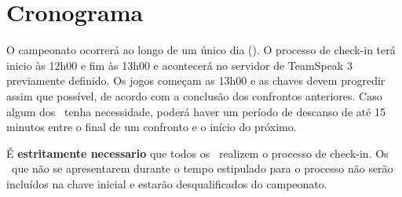 \section{Cronograma}

O campeonato ocorrerá ao longo de um único dia (\FullDate). O processo de check-in terá inicio às 12h00 e fim às 13h00 e acontecerá no servidor de TeamSpeak 3 previamente definido.  Os jogos começam as 13h00 e as chaves devem progredir assim que possível, de acordo com a conclusão dos confrontos anteriores. Caso algum dos \BasicUnitPl\ tenha necessidade, poderá haver um período de descanso de até 15 minutos entre o final de um confronto e o início do próximo.

É \textbf{estritamente necessario} que todos os \BasicUnitPl\ realizem o processo de check-in. Os \BasicUnitPl\ que não se apresentarem durante o tempo estipulado para o processo não serão incluídos na chave inicial e estarão desqualificados do campeonato.